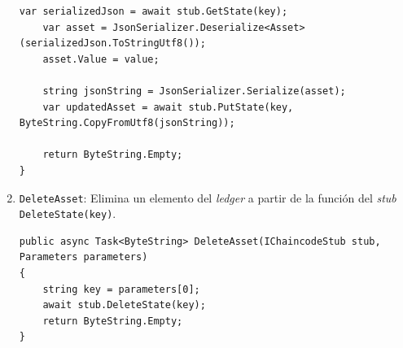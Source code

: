 \begin{enumerate}
\begin{lstlisting}[caption={Función \texttt{UpdateAsset(...)}}]
    var serializedJson = await stub.GetState(key);
    var asset = JsonSerializer.Deserialize<Asset>(serializedJson.ToStringUtf8());
    asset.Value = value;
    
    string jsonString = JsonSerializer.Serialize(asset);
    var updatedAsset = await stub.PutState(key, ByteString.CopyFromUtf8(jsonString));
    
    return ByteString.Empty;
}
\end{lstlisting}

\item \texttt{DeleteAsset}: Elimina un elemento del \textit{ledger} a partir de la función del \textit{stub} \texttt{DeleteState(key)}.\\

\begin{lstlisting}[caption={Función \texttt{DeleteAsset(...)}}]
public async Task<ByteString> DeleteAsset(IChaincodeStub stub, Parameters parameters)
{
    string key = parameters[0];
    await stub.DeleteState(key); 
    return ByteString.Empty;
}
\end{lstlisting}
\end{enumerate}







%
%
%
%




